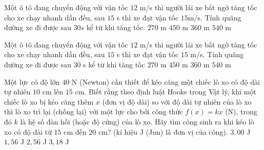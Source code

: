 \begin{ex}%
	Một ô tô đang chuyển động với vận tốc $12$ m/s thì người lái xe bất ngờ tăng tốc cho xe chạy nhanh dần đều, sau $15$ s thì xe đạt vận tốc $15$m/s. Tính quãng đường xe đi được sau $30s$ 
	kể từ khi tăng tốc.
	\choice
	{$270$ m}
	{\True $450$ m}
	{$360$ m}
	{$540$ m}
\end{ex}
\begin{ex}%
	Một ô tô đang chuyển động với vận tốc $12$ m/s thì người lái xe bất ngờ tăng tốc cho xe chạy nhanh dần đều, sau $15$ s thì xe đạt vận tốc $15$ m/s. Tính quãng đường xe đi được sau $30$ s 
	kể từ khi tăng tốc
	\choice
	{$270$ m}
	{\True $450$ m}
	{$360$ m}
	{$540$ m}
\end{ex}
\begin{ex}%
	Một lực có độ lớn $40$ N (Newton) cần thiết để kéo căng một chiếc lò xo có độ dài tự nhiên $10$ cm lên $15$ cm. Biết rằng theo định luật Hooke trong Vật lý, khi một chiếc lò xo bị kéo căng thêm $x$ (đơn vị độ dài) so với độ dài tự nhiên của lò xo thì lò xo trì lại (chống lại) với một lực cho bởi công thức $f(x)=kx$ (N), trong đó $k$ là hệ số đàn hồi (hoặc độ cứng) của lò xo. Hãy tìm công sinh ra khi kéo lò xo có độ dài từ $15$ cm đến $20$ cm? (kí hiệu J (Jun) là đơn vị của công).
	\choice
	{\True $3{,}00$ J}
	{$1{,}56$ J}
	{$2{,}56$ J}
	{$3{,}18$ J}
\end{ex}
